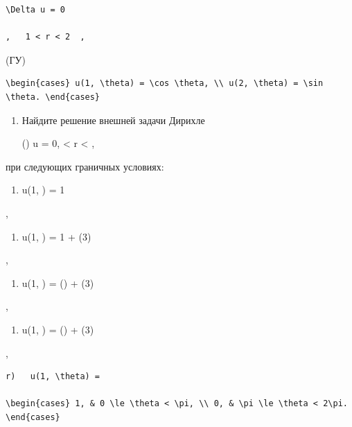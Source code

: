 \documentclass[
  ukrainian,
]{article}
\providecommand{\tightlist}{%
  \setlength{\itemsep}{0pt}\setlength{\parskip}{0pt}}
\begin{document}
\begin{verbatim}
\Delta u = 0

,   1 < r < 2  ,
\end{verbatim}

(ГУ)

\begin{verbatim}
\begin{cases} u(1, \theta) = \cos \theta, \\ u(2, \theta) = \sin \theta. \end{cases}
\end{verbatim}

\begin{enumerate}
\def\labelenumi{\arabic{enumi}.}
\setcounter{enumi}{1}
\item
  Найдите решение внешней задачи Дирихле

  (\forall \Pi) \quad \Delta u = 0,  \textless{} r \textless{}
  \infty,
\end{enumerate}

при следующих граничных условиях:

\begin{enumerate}
\def\labelenumi{\alph{enumi})}
\tightlist
\item
  u(1, \theta) = 1
\end{enumerate}

,

\begin{enumerate}
\def\labelenumi{\arabic{enumi})}
\setcounter{enumi}{5}
\tightlist
\item
  u(1, \theta) = 1 + \cos(3\theta)
\end{enumerate}

,

\begin{enumerate}
\def\labelenumi{\Alph{enumi})}
\setcounter{enumi}{1}
\tightlist
\item
  u(1, \theta) = \sin(\theta) + \cos(3\theta)
\end{enumerate}

,

\begin{enumerate}
\def\labelenumi{\Alph{enumi})}
\setcounter{enumi}{1}
\tightlist
\item
  u(1, \theta) = \sin(\theta) + \cos(3\theta)
\end{enumerate}

,

\begin{verbatim}
r)   u(1, \theta) =

\begin{cases} 1, & 0 \le \theta < \pi, \\ 0, & \pi \le \theta < 2\pi. \end{cases}
\end{verbatim}
\end{document}
